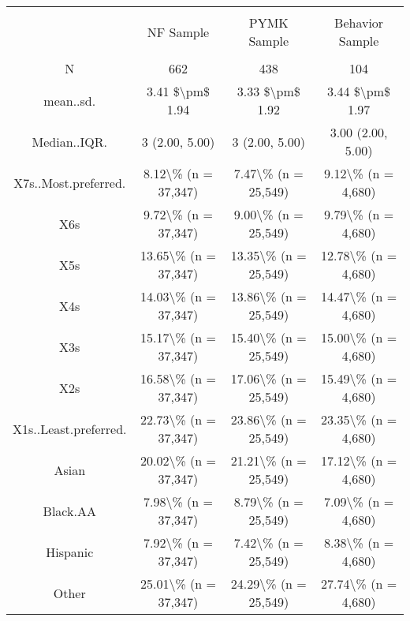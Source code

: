 
\begin{table}[!htbp] \centering 
  \caption{} 
  \label{} 
\begin{tabular}{@{\extracolsep{5pt}} cccc} 
\\[-1.8ex]\hline 
\hline \\[-1.8ex] 
 & NF Sample & PYMK Sample & Behavior Sample \\ 
\hline \\[-1.8ex] 
N & 662 & 438 & 104 \\ 
mean..sd. & 3.41 \$\textbackslash pm\$ 1.94 & 3.33 \$\textbackslash pm\$ 1.92 & 3.44 \$\textbackslash pm\$ 1.97 \\ 
Median..IQR. & 3 (2.00, 5.00) & 3 (2.00, 5.00) & 3.00 (2.00, 5.00) \\ 
X7s..Most.preferred. & 8.12\textbackslash \% (n = 37,347) & 7.47\textbackslash \% (n = 25,549) & 9.12\textbackslash \% (n = 4,680) \\ 
X6s & 9.72\textbackslash \% (n = 37,347) & 9.00\textbackslash \% (n = 25,549) & 9.79\textbackslash \% (n = 4,680) \\ 
X5s & 13.65\textbackslash \% (n = 37,347) & 13.35\textbackslash \% (n = 25,549) & 12.78\textbackslash \% (n = 4,680) \\ 
X4s & 14.03\textbackslash \% (n = 37,347) & 13.86\textbackslash \% (n = 25,549) & 14.47\textbackslash \% (n = 4,680) \\ 
X3s & 15.17\textbackslash \% (n = 37,347) & 15.40\textbackslash \% (n = 25,549) & 15.00\textbackslash \% (n = 4,680) \\ 
X2s & 16.58\textbackslash \% (n = 37,347) & 17.06\textbackslash \% (n = 25,549) & 15.49\textbackslash \% (n = 4,680) \\ 
X1s..Least.preferred. & 22.73\textbackslash \% (n = 37,347) & 23.86\textbackslash \% (n = 25,549) & 23.35\textbackslash \% (n = 4,680) \\ 
Asian & 20.02\textbackslash \% (n = 37,347) & 21.21\textbackslash \% (n = 25,549) & 17.12\textbackslash \% (n = 4,680) \\ 
Black.AA & 7.98\textbackslash \% (n = 37,347) & 8.79\textbackslash \% (n = 25,549) & 7.09\textbackslash \% (n = 4,680) \\ 
Hispanic & 7.92\textbackslash \% (n = 37,347) & 7.42\textbackslash \% (n = 25,549) & 8.38\textbackslash \% (n = 4,680) \\ 
Other & 25.01\textbackslash \% (n = 37,347) & 24.29\textbackslash \% (n = 25,549) & 27.74\textbackslash \% (n = 4,680) \\ 

\end{tabular}
\end{table}
